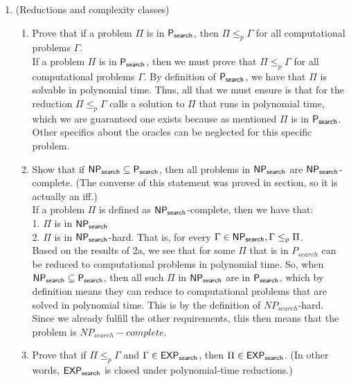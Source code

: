 \documentclass[11pt]{article}
\begin{document}
\begin{enumerate}
    \item (Reductions and complexity classes)  
    \begin{enumerate}
        \item Prove that if a problem $\Pi$ is in $\mathsf{P_{search}}$, then $\Pi\leq_p \Gamma$ for all computational problems $\Gamma$. \\
        
        If a problem $\Pi$ is in $\mathsf{P_{search}}$, then we must prove that $\Pi\leq_p \Gamma$ for all computational problems $\Gamma$. By definition of $\mathsf{P_{search}}$, we have that $\Pi$ is solvable in polynomial time. Thus, all that we must ensure is that for the reduction $\Pi\leq_p \Gamma$ calls a solution to $\Pi$ that runs in polynomial time, which we are guaranteed one exists because as mentioned $\Pi$ is in $\mathsf{P_{search}}$. Other specifics about the oracles can be neglected for this specific problem. \\
        
        \item Show that if $\mathsf{NP_{search}}\subseteq \mathsf{P_{search}}$, then all problems in $\mathsf{NP_{search}}$ are $\mathsf{NP_{search}}$-complete.  (The converse of this statement was proved in section, so it is actually an iff.) \\
        
        If a problem $\Pi$ is defined as $\mathsf{NP_{search}}$-complete, then we have that: \\
        1. $\Pi$ is in $\mathsf{NP_{search}}$ \\
        2. $\Pi$ is in $\mathsf{NP_{search}}$-hard. That is, for every $\Gamma \in \mathsf{NP_{search}}, \Gamma \leq_p \Pi$.\\
        
        Based on the results of 2a, we see that for some $\Pi$ that is in $P_{search}$ can be reduced to computational problems in polynomial time. So, when $\mathsf{NP_{search}}\subseteq \mathsf{P_{search}}$, then all such $\Pi$  in $\mathsf{NP_{search}}$ are in $\mathsf{P_{search}}$, which by definition means they can reduce to computational problems that are solved in polynomial time. This is by the definition of $NP_{search}$-hard. Since we already fulfill the other requirements, this then means that the problem is $NP_{search}-complete$.
         
        
        
        \item  Prove that if 
$\Pi\leq_p \Gamma$ and $\Gamma\in \mathsf{EXP_{search}}$, then $\Pi\in \mathsf{EXP_{search}}$. (In other words, $\mathsf{EXP_{search}}$ is closed under polynomial-time reductions.) 
    \end{enumerate} \\
    

\end{enumerate}
\end{document}
